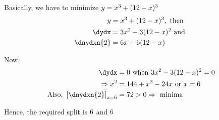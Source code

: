 \watchout 
{}

\ifprintanswers
\fi

\begin{solution}[\halfpage]
   Basically, we have to minimize $y = x^3 + (12-x)^3$
   \begin{align}
      y &= x^3 + (\vbone -x)^3, \text{ then } \\
      \dydx &= 3x^2 - 3(\vbone - x)^2 \text{ and } \\
      \dnydxn{2} &= 6x + 6(\vbone-x)
   \end{align}
   
   Now, 
   \begin{align}
      \dydx &= 0 \text { when } 3x^2 - 3(\vbone - x)^2 = 0 \\
      \Rightarrow x^2 &= \vbfour + x^2 - \vbthree x \text{ or } x = \vbtwo \\
      \text{Also, }\left[\dnydxn{2}\right]_{x=\vbtwo} &= \vbfive > 0 \Rightarrow \text{ minima }
   \end{align}
   
   Hence, the required split is $6$ and $6$
\end{solution}
